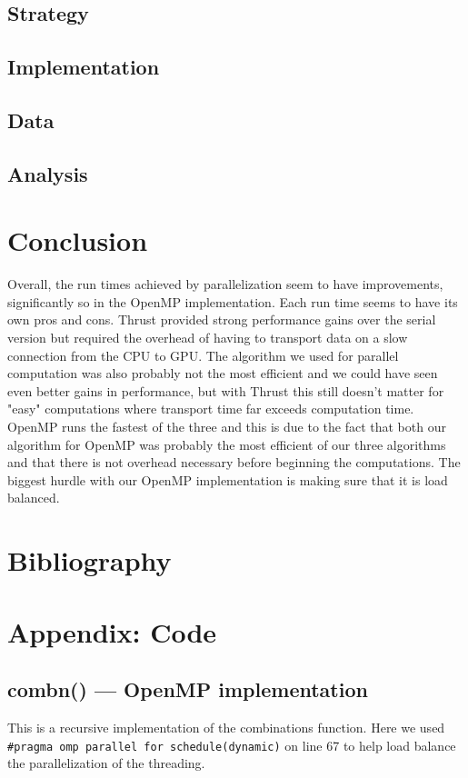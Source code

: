 \documentclass[titlepage, 11pt]{article}
\begin{document}
\subsection{Strategy}

\subsection{Implementation}


\subsection{Data}

\subsection{Analysis}




\section{Conclusion}
Overall, the run times achieved by parallelization seem to have improvements, significantly so in the OpenMP implementation. Each run time seems to have its own pros and cons. Thrust provided strong performance gains over the serial version but required the overhead of having to transport data on a slow connection from the CPU to GPU. The algorithm we used for parallel computation was also probably not the most efficient and we could have seen even better gains in performance, but with Thrust this still doesn't matter for "easy" computations where transport time far exceeds computation time. OpenMP runs the fastest of the three and this is due to the fact that both our algorithm for OpenMP was probably the most efficient of our three algorithms and that there is not overhead necessary before beginning the computations. The biggest hurdle with our OpenMP implementation is making sure that it is load balanced.


\section{Bibliography}


\pagebreak
\appendix
\section{Appendix: Code}
\subsection{combn() --- OpenMP implementation}

This is a recursive implementation of the combinations function. Here we used \verb; #pragma omp parallel for schedule(dynamic); on line 67 to help load balance the parallelization of the threading.  \\
\end{document}
